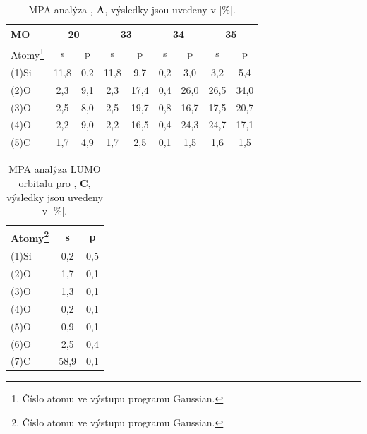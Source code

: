 \documentclass[
  digital, %
  table,   %
  lof,     %
  lot,     %
  oneside,
]{fithesis3}
\begin{document}
\begin{table}[htbp]\begin{minipage}{\textwidth}
\caption{MPA analýza , \textbf{A}, výsledky jsou uvedeny v [\%].}
\begin{center}
\begin{tabular}{|l|c|c|c|c|c|c|c|c|}
\hline
 MO &  \multicolumn{2}{c|}{20} &  \multicolumn{2}{c|}{33} &  \multicolumn{2}{c|}{34} &  \multicolumn{2}{c|}{35} \\ \hline
\label{si_ch3_och3_MPA} Atomy\footnote{Číslo atomu ve výstupu programu Gaussian.} & s & p & s & p & s & p & s & p \\ \hline
(1)Si & 11,8  & 0,2  & 11,8  & 9,7  & 0,2  & 3,0  & 3,2  & 5,4  \\ \hline
(2)O & 2,3  & 9,1  & 2,3  & 17,4  & 0,4  & 26,0  & 26,5  & 34,0  \\ \hline
(3)O & 2,5  & 8,0  & 2,5  & 19,7  & 0,8  & 16,7  & 17,5  & 20,7  \\ \hline
(4)O & 2,2  & 9,0  & 2,2  & 16,5  & 0,4  & 24,3  & 24,7  & 17,1  \\ \hline
(5)C & 1,7  & 4,9  & 1,7  & 2,5  & 0,1  & 1,5  & 1,6  & 1,5  \\ \hline
\end{tabular}
\end{center}
\end{minipage}
\end{table}

\begin{table}[htbp]
\begin{minipage}{\textwidth}
\caption{MPA analýza LUMO orbitalu pro ,  \textbf{C}, výsledky jsou uvedeny v [\%].}
\begin{center}
\begin{tabular}{|l|c|c|}
\hline
 Atomy\footnote{Číslo atomu ve výstupu programu Gaussian.} \label{si_ch3_och3_5_MPA} & \multicolumn{1}{c|}{s} & \multicolumn{1}{c|}{p} \\ \hline
(1)Si & 0,2  & 0,5  \\ \hline
(2)O & 1,7  & 0,1  \\ \hline
(3)O & 1,3  & 0,1  \\ \hline
(4)O & 0,2  & 0,1  \\ \hline
(5)O & 0,9  & 0,1  \\ \hline
(6)O & 2,5  & 0,4  \\ \hline
(7)C & 58,9  & 0,1  \\ \hline
\end{tabular}\end{center}\end{minipage}
\end{table}
\end{document}
